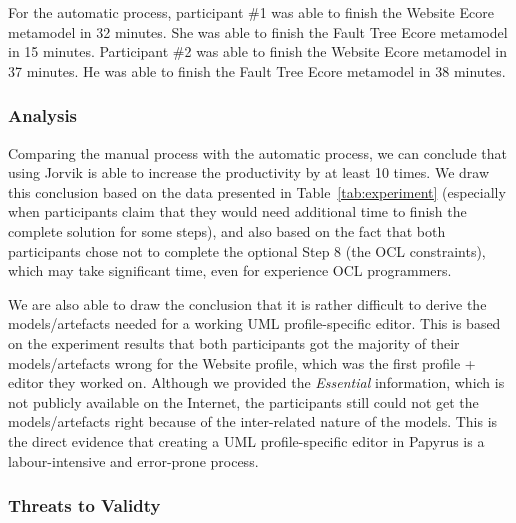For the automatic process, participant \#1 was able to finish the Website Ecore metamodel in 32 minutes.
She was able to finish the Fault Tree Ecore metamodel in 15 minutes.
Participant \#2 was able to finish the Website Ecore metamodel in 37 minutes.
He was able to finish the Fault Tree Ecore metamodel in 38 minutes.

\subsubsection{Analysis}
Comparing the manual process with the automatic process, we can conclude that using Jorvik is able to increase the productivity by at least 10 times. 
We draw this conclusion based on the data presented in Table~\ref{tab:experiment} (especially when participants claim that they would need additional time to finish the complete solution for some steps), and also based on the fact that both participants chose not to complete the optional Step 8 (the OCL constraints), which may take significant time, even for experience OCL programmers.

We are also able to draw the conclusion that it is rather difficult to derive the models/artefacts needed for a working UML profile-specific editor. 
This is based on the experiment results that both participants got the majority of their models/artefacts wrong for the Website profile, which was the first profile + editor they worked on.
Although we provided the \textit{Essential} information, which is not publicly available on the Internet, the participants still could not get the models/artefacts right because of the inter-related nature of the models.
This is the direct evidence that creating a UML profile-specific editor in Papyrus is a labour-intensive and error-prone process.

\subsubsection{Threats to Validty}

